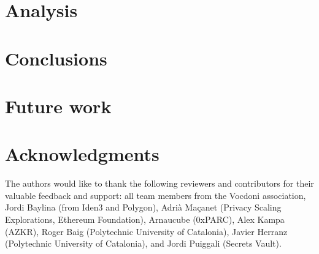 \documentclass[runningheads, draft]{llncs}
\begin{document}
\section{Analysis}
\label{sec:analysis}


\section{Conclusions}
\label{sec:conclusions}


\section{Future work}
\label{sec:future-work}


\section*{Acknowledgments}
\label{sec:acknowledgments}

The authors would like to thank the following reviewers and contributors for their valuable feedback and support: all team members from the Vocdoni association, Jordi Baylina (from Iden3 and Polygon), Adrià Maçanet (Privacy Scaling Explorations, Ethereum Foundation), Arnaucube (0xPARC), Alex Kampa (AZKR), Roger Baig (Polytechnic University of Catalonia), Javier Herranz (Polytechnic University of Catalonia), and Jordi Puiggali (Secrets Vault).





\end{document}
